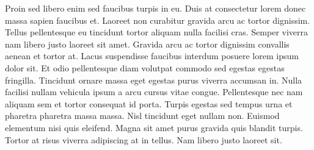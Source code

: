 \documentclass[a4paper, oneside, 10pt]{report}
\begin{document}
				Proin sed libero enim sed faucibus turpis in eu. Duis at consectetur lorem donec massa sapien faucibus et. Laoreet non curabitur gravida arcu ac tortor dignissim. Tellus pellentesque eu tincidunt tortor aliquam nulla facilisi cras. Semper viverra nam libero justo laoreet sit amet. Gravida arcu ac tortor dignissim convallis aenean et tortor at. Lacus suspendisse faucibus interdum posuere lorem ipsum dolor sit. Et odio pellentesque diam volutpat commodo sed egestas egestas fringilla. Tincidunt ornare massa eget egestas purus viverra accumsan in. Nulla facilisi nullam vehicula ipsum a arcu cursus vitae congue. Pellentesque nec nam aliquam sem et tortor consequat id porta. Turpis egestas sed tempus urna et pharetra pharetra massa massa. Nisl tincidunt eget nullam non. Euismod elementum nisi quis eleifend. Magna sit amet purus gravida quis blandit turpis. Tortor at risus viverra adipiscing at in tellus. Nam libero justo laoreet sit.



	
\end{document}
